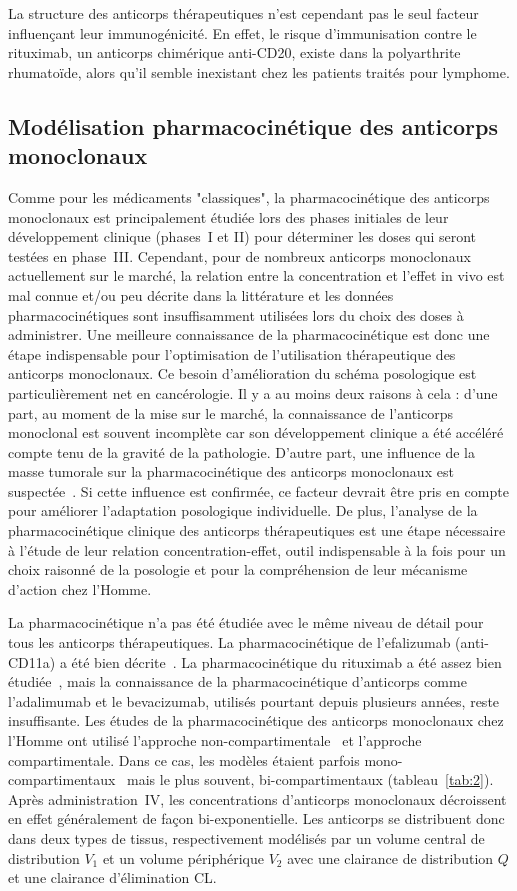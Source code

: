 La structure des anticorps thérapeutiques n'est cependant pas le seul facteur influençant leur immunogénicité. En effet, le risque d'immunisation contre le rituximab, un anticorps chimérique anti-CD20, existe dans la polyarthrite rhumatoïde, alors qu'il semble inexistant chez les patients traités pour lymphome.
\subsection{Modélisation pharmacocinétique des anticorps monoclonaux}
Comme pour les médicaments "classiques", la pharmacocinétique des anticorps monoclonaux est principalement étudiée lors des phases initiales de leur développement clinique (phases~I et II) pour déterminer les doses qui seront testées en phase~III. Cependant, pour de nombreux anticorps monoclonaux actuellement sur le marché, la relation entre la concentration et l'effet in vivo est mal connue et/ou peu décrite dans la littérature et les données pharmacocinétiques sont insuffisamment utilisées lors du choix des doses à administrer. Une meilleure connaissance de la pharmacocinétique est donc une étape indispensable pour l'optimisation de l'utilisation thérapeutique des anticorps monoclonaux. Ce besoin d'amélioration du schéma posologique est particulièrement net en cancérologie. Il y a au moins deux raisons à cela : d'une part, au moment de la mise sur le marché, la connaissance de l'anticorps monoclonal est souvent incomplète car son développement clinique a été accéléré compte tenu de la gravité de la pathologie. D'autre part, une influence de la masse tumorale sur la pharmacocinétique des anticorps monoclonaux est suspectée~\citep{REF45, REF46, REF47}. Si cette influence est confirmée, ce facteur devrait être pris en compte pour améliorer l'adaptation posologique individuelle. De plus, l'analyse de la pharmacocinétique clinique des anticorps thérapeutiques est une étape nécessaire à l'étude de leur relation concentration-effet, outil indispensable à la fois pour un choix raisonné de la posologie et pour la compréhension de leur mécanisme d'action chez l'Homme. 

La pharmacocinétique n'a pas été étudiée avec le même niveau de détail pour tous les anticorps thérapeutiques. La pharmacocinétique de l'efalizumab (anti-CD11a) a été bien décrite~\citep{REF48, REF49, REF50}. La pharmacocinétique du rituximab a été assez bien étudiée~\citep{REF51, REF52}, mais la connaissance de la pharmacocinétique d'anticorps comme l'adalimumab et le bevacizumab, utilisés pourtant depuis plusieurs années, reste insuffisante. Les études de la pharmacocinétique des anticorps monoclonaux chez l'Homme ont utilisé l'approche non-compartimentale~\citep{REF53,REF54, REF55, REF56, REF57, REF58, REF59} et l'approche compartimentale. Dans ce cas, les modèles étaient parfois mono-compartimentaux~\citep{REF60} mais le plus souvent, bi-compartimentaux (tableau~\ref{tab:2}). Après administration~\gls{IV}, les concentrations d'anticorps monoclonaux décroissent en effet généralement de façon bi-exponentielle. Les anticorps se distribuent donc dans deux types de tissus, respectivement modélisés par un volume central de distribution $V_1$ et un volume périphérique $V_2$ avec une clairance de distribution $Q$ et une clairance d'élimination \gls{CL}. 

